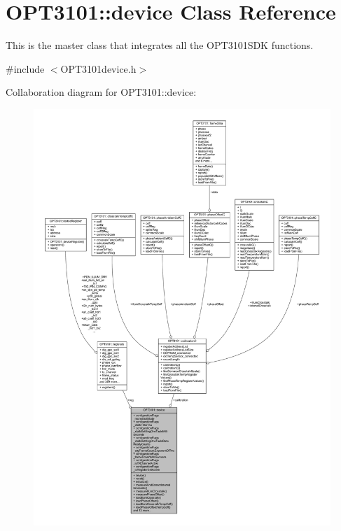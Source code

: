 \hypertarget{class_o_p_t3101_1_1device}{}\section{O\+P\+T3101\+:\+:device Class Reference}
\label{class_o_p_t3101_1_1device}


This is the master class that integrates all the O\+P\+T3101\+S\+DK functions.  




{\ttfamily \#include $<$O\+P\+T3101device.\+h$>$}



Collaboration diagram for O\+P\+T3101\+:\+:device\+:\nopagebreak
\begin{figure}[H]
\begin{center}
\leavevmode
\includegraphics[width=350pt]{class_o_p_t3101_1_1device__coll__graph}
\end{center}
\end{figure}

